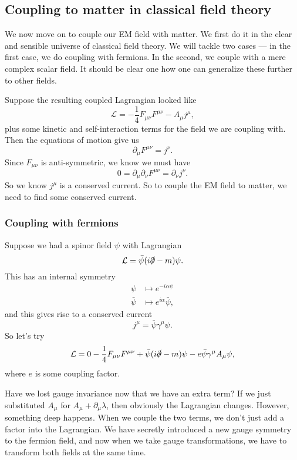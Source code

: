 \documentclass[a4paper]{article}
\begin{document}
\subsection{Coupling to matter in classical field theory}
We now move on to couple our EM field with matter. We first do it in the clear and sensible universe of classical field theory. We will tackle two cases --- in the first case, we do coupling with fermions. In the second, we couple with a mere complex scalar field. It should be clear one how one can generalize these further to other fields.

Suppose the resulting coupled Lagrangian looked like
\[
  \mathcal{L} = - \frac{1}{4} F_{\mu\nu}F^{\mu\nu} - A_\mu j^\mu,
\]
plus some kinetic and self-interaction terms for the field we are coupling with. Then the equations of motion give us
\[
  \partial_\mu F^{\mu\nu} = j^\nu.
\]
Since $F_{\mu\nu}$ is anti-symmetric, we know we must have
\[
  0 = \partial_\mu \partial_\nu F^{\mu\nu} = \partial_\nu j^\nu.
\]
So we know $j^\mu$ is a conserved current. So to couple the EM field to matter, we need to find some conserved current.

\subsubsection*{Coupling with fermions}
Suppose we had a spinor field $\psi$ with Lagrangian
\[
  \mathcal{L} = \bar\psi (i \slashed\partial -m ) \psi.
\]
This has an internal symmetry
\begin{align*}
  \psi &\mapsto e^{-i\alpha \psi}\\
  \bar\psi &\mapsto e^{i \alpha} \bar\psi,
\end{align*}
and this gives rise to a conserved current
\[
  j^\mu = \bar\psi \gamma^\mu \psi.
\]
So let's try
\[
  \mathcal{L} = 0-\frac{1}{4}F_{\mu\nu}F^{\mu\nu} + \bar\psi(i \slashed \partial- m)\psi - e \bar\psi \gamma^\mu A_\mu \psi,
\]
where $e$ is some coupling factor.

Have we lost gauge invariance now that we have an extra term? If we just substituted $A_\mu$ for $A_\mu + \partial_\mu \lambda$, then obviously the Lagrangian changes. However, something deep happens. When we couple the two terms, we don't just add a factor into the Lagrangian. We have secretly introduced a new gauge symmetry to the fermion field, and now when we take gauge transformations, we have to transform both fields at the same time.
\end{document}
